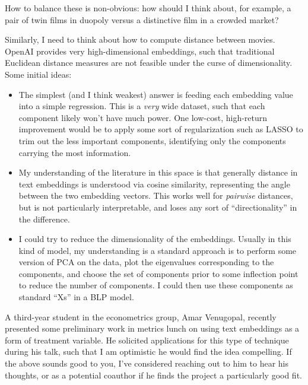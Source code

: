 \documentclass{article}
\begin{document}
How to balance these is non-obvious: how should I think about, for example, a pair of twin films in duopoly versus a distinctive film in a crowded market? 

Similarly, I need to think about how to compute distance between movies. OpenAI provides very high-dimensional embeddings, such that traditional Euclidean distance measures are not feasible under the curse of dimensionality. Some initial ideas:
\begin{itemize}
    \item The simplest (and I think weakest) answer is feeding each embedding value into a simple regression. This is a \emph{very} wide dataset, such that each component likely won't have much power. One low-cost, high-return improvement would be to apply some sort of regularization such as LASSO to trim out the less important components, identifying only the components carrying the most information. 
    \item My understanding of the literature in this space is that generally distance in text embeddings is understood via cosine similarity, representing the angle between the two embedding vectors. This works well for \emph{pairwise} distances, but is not particularly interpretable, and loses any sort of ``directionality'' in the difference.
    \item I could try to reduce the dimensionality of the embeddings. Usually in this kind of model, my understanding is a standard approach is to perform some version of PCA on the data, plot the eigenvalues corresponding to the components, and choose the set of components prior to some inflection point to reduce the number of components. I could then use these components as standard ``Xs'' in a BLP model. 
\end{itemize}

A third-year student in the econometrics group, Amar Venugopal, recently presented some preliminary work in metrics lunch on using text embeddings as a form of treatment variable. He solicited applications for this type of technique during his talk, such that I am optimistic he would find the idea compelling. If the above sounds good to you, I've considered reaching out to him to hear his thoughts, or as a potential coauthor if he finds the project a particularly good fit. 
\end{document}
